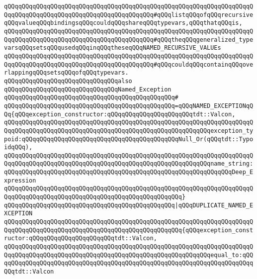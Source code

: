 \verb|qQQqqQQqqQQqqQQqqQQqqQQqqQQqqQQqqQQqqQQqqQQqqQQqqQQqqQQqqQQqqQQqqQQqqQQqqQQqqQQqqQQqqQQqqQQqqQQqqQQqqQQqqQQqqQQq#qQQqlistqQQqofqQQqrecursiveqQQqvalueqQQqbindingsqQQqcouldqQQqshareqQQqtypevars,qQQqthatqQQqis,|\newline
\verb|qQQqqQQqqQQqqQQqqQQqqQQqqQQqqQQqqQQqqQQqqQQqqQQqqQQqqQQqqQQqqQQqqQQqqQQqqQQqqQQqqQQqqQQqqQQqqQQqqQQqqQQqqQQqqQQq#qQQqtheqQQqgeneralized_typevarsqQQqsetsqQQqusedqQQqinqQQqtheseqQQqNAMED_RECURSIVE_VALUEs|\newline
\verb|qQQqqQQqqQQqqQQqqQQqqQQqqQQqqQQqqQQqqQQqqQQqqQQqqQQqqQQqqQQqqQQqqQQqqQQqqQQqqQQqqQQqqQQqqQQqqQQqqQQqqQQqqQQqqQQq#qQQqcouldqQQqcontainqQQqoverlappingqQQqsetsqQQqofqQQqtypevars.|\newline
\newline
\newline
\newline
\verb|qQQqqQQqqQQqqQQqqQQqqQQqqQQqqQQqalso|\newline
\verb|qQQqqQQqqQQqqQQqqQQqqQQqqQQqqQQqNamed_Exception|\newline
\verb|qQQqqQQqqQQqqQQqqQQqqQQqqQQqqQQqqQQqqQQqqQQqqQQq#|\newline
\verb|qQQqqQQqqQQqqQQqqQQqqQQqqQQqqQQqqQQqqQQqqQQqqQQq=qQQqNAMED_EXCEPTIONqQQq{qQQqexception_constructor:qQQqqQQqqQQqqQQqqQQqqQQqtdt::Valcon,|\newline
\verb|qQQqqQQqqQQqqQQqqQQqqQQqqQQqqQQqqQQqqQQqqQQqqQQqqQQqqQQqqQQqqQQqqQQqqQQqqQQqqQQqqQQqqQQqqQQqqQQqqQQqqQQqqQQqqQQqqQQqqQQqqQQqqQQqexception_typoid:qQQqqQQqqQQqqQQqqQQqqQQqqQQqqQQqqQQqqQQqqQQqNull_Or(qQQqtdt::TypoidqQQq),|\newline
\verb|qQQqqQQqqQQqqQQqqQQqqQQqqQQqqQQqqQQqqQQqqQQqqQQqqQQqqQQqqQQqqQQqqQQqqQQqqQQqqQQqqQQqqQQqqQQqqQQqqQQqqQQqqQQqqQQqqQQqqQQqqQQqqQQqname_string:qQQqqQQqqQQqqQQqqQQqqQQqqQQqqQQqqQQqqQQqqQQqqQQqqQQqqQQqqQQqqQQqDeep_Expression|\newline
\verb|qQQqqQQqqQQqqQQqqQQqqQQqqQQqqQQqqQQqqQQqqQQqqQQqqQQqqQQqqQQqqQQqqQQqqQQqqQQqqQQqqQQqqQQqqQQqqQQqqQQqqQQqqQQqqQQqqQQqqQQq}|\newline
\newline
\verb|qQQqqQQqqQQqqQQqqQQqqQQqqQQqqQQqqQQqqQQqqQQqqQQq|\verb#|qQQqDUPLICATE_NAMED_EXCEPTION#\newline
\verb|qQQqqQQqqQQqqQQqqQQqqQQqqQQqqQQqqQQqqQQqqQQqqQQqqQQqqQQqqQQqqQQqqQQqqQQqqQQqqQQqqQQqqQQqqQQqqQQqqQQqqQQqqQQqqQQqqQQqqQQq{qQQqexception_constructor:qQQqqQQqqQQqqQQqqQQqqQQqtdt::Valcon,|\newline
\verb|qQQqqQQqqQQqqQQqqQQqqQQqqQQqqQQqqQQqqQQqqQQqqQQqqQQqqQQqqQQqqQQqqQQqqQQqqQQqqQQqqQQqqQQqqQQqqQQqqQQqqQQqqQQqqQQqqQQqqQQqqQQqqQQqequal_to:qQQqqQQqqQQqqQQqqQQqqQQqqQQqqQQqqQQqqQQqqQQqqQQqqQQqqQQqqQQqqQQqqQQqqQQqqQQqtdt::Valcon|\newline
